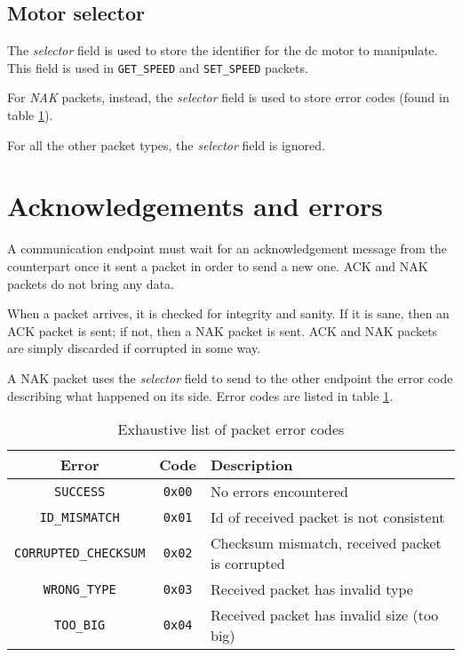 \subsection{Motor selector}
The \emph{selector} field is used to store the identifier for the dc motor to
manipulate. This field is used in \texttt{GET\_SPEED} and \texttt{SET\_SPEED} packets.

For \emph{NAK} packets, instead, the \emph{selector} field is used to store
error codes (found in table \ref{tab:packet-error-codes}).

For all the other packet types, the \emph{selector} field is ignored.

\section{Acknowledgements and errors}
\label{client-master-comm-ackerr}
A communication endpoint must wait for an acknowledgement message from the
counterpart once it sent a packet in order to send a new one. ACK and NAK
packets do not bring any data.

When a packet arrives, it is checked for integrity and sanity. If it is sane,
then an ACK packet is sent; if not, then a NAK packet is sent.
ACK and NAK packets are simply discarded if corrupted in some way.

A NAK packet uses the \emph{selector} field to send to the other endpoint the
error code describing what happened on its side. Error codes are listed in
table \ref{tab:packet-error-codes}.

\begin{table}[bh]
  \begin{tabularx}{\textwidth}{c c X}
    \toprule
    Error & Code & Description \\
    \midrule
    \texttt{SUCCESS}             & \texttt{0x00} & No errors encountered \\
    \texttt{ID\_MISMATCH}        & \texttt{0x01} & Id of received packet is not consistent \\
    \texttt{CORRUPTED\_CHECKSUM} & \texttt{0x02} & Checksum mismatch, received packet is corrupted \\
    \texttt{WRONG\_TYPE}         & \texttt{0x03} & Received packet has invalid type \\
    \texttt{TOO\_BIG}            & \texttt{0x04} & Received packet has invalid size (too big) \\
    \bottomrule
  \end{tabularx}
  \caption{Exhaustive list of packet error codes}
  \label{tab:packet-error-codes}
\end{table}
